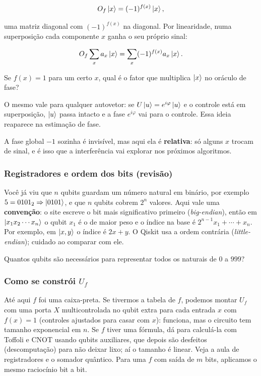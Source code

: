 \[
O_f\left|{x}\right>=(-1)^{f(x)}\left|{x}\right>,
\]

uma matriz diagonal com \((-1)^{f(x)}\) na diagonal. Por linearidade, numa superposição cada componente \(x\) ganha o seu próprio sinal:

\[
O_f\sum_x a_x\left|{x}\right>=\sum_x (-1)^{f(x)}a_x\left|{x}\right>.
\]

Se \(f(x)=1\) para um certo \(x\), qual é o fator que multiplica \(\left|{x}\right>\) no oráculo de fase?

O mesmo vale para qualquer autovetor: se \(U\left|{u}\right>=e^{i\varphi}\left|{u}\right>\) e o controle está em superposição, \(\left|{u}\right>\) passa intacto e a fase \(e^{i\varphi}\) vai para o controle. Essa ideia reaparece na estimação de fase.

A fase global \(-1\) sozinha é invisível, mas aqui ela é \textbf{relativa}: só alguns \(x\) trocam de sinal, e é isso que a interferência vai explorar nos próximos algoritmos.

\subsubsection{Registradores e ordem dos bits (revisão)}\label{registradores-e-ordem-dos-bits-revisuxe3o}

Você já viu que \(n\) qubits guardam um número natural em binário, por exemplo \(5=0101_2\Rightarrow\left|{0101}\right>\), e que \(n\) qubits cobrem \(2^n\) valores. Aqui vale uma \textbf{convenção}: o site escreve o bit mais significativo primeiro (\emph{big-endian}), então em \(\left|{x_1x_2\cdots x_n}\right>\) o qubit \(x_1\) é o de maior peso e o índice na base é \(2^{n-1}x_1+\cdots+x_n\). Por exemplo, em \(\left|{x,y}\right>\) o índice é \(2x+y\). O Qiskit usa a ordem contrária (\emph{little-endian}); cuidado ao comparar com ele.

Quantos qubits são necessários para representar todos os naturais de \(0\) a \(999\)?

\subsubsection{\texorpdfstring{Como se constrói \(U_f\)}{Como se constrói U\_f}}\label{como-se-construxf3i-u_f}

Até aqui \(f\) foi uma caixa-preta. Se tivermos a tabela de \(f\), podemos montar \(U_f\) com uma porta \(X\) multicontrolada no qubit extra para cada entrada \(x\) com \(f(x)=1\) (controles ajustados para casar com \(x\)): funciona, mas o circuito tem tamanho exponencial em \(n\). Se \(f\) tiver uma fórmula, dá para calculá-la com Toffoli e CNOT usando qubits auxiliares, que depois são desfeitos (descomputação) para não deixar lixo; aí o tamanho é linear. Veja a aula de registradores e o somador quântico. Para uma \(f\) com saída de \(m\) bits, aplicamos o mesmo raciocínio bit a bit.

